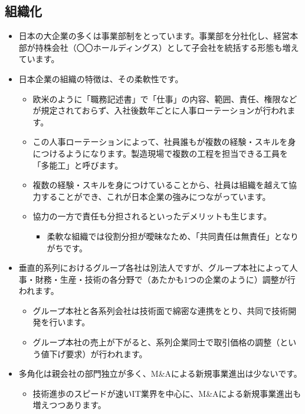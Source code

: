 \documentclass[
]{book}
\providecommand{\tightlist}{%
  \setlength{\itemsep}{0pt}\setlength{\parskip}{0pt}}
\begin{document}
\hypertarget{japan-organization}{%
\subsection{組織化}\label{japan-organization}}

\begin{itemize}
\item
  日本の大企業の多くは事業部制をとっています。事業部を分社化し、経営本部が持株会社（〇〇ホールディングス）として子会社を統括する形態も増えています。
\item
  日本企業の組織の特徴は、その柔軟性です。

  \begin{itemize}
  \item
    欧米のように「職務記述書」で「仕事」の内容、範囲、責任、権限などが規定されておらず、入社後数年ごとに人事ローテーションが行われます。
  \item
    この人事ローテーションによって、社員誰もが複数の経験・スキルを身につけるようになります。製造現場で複数の工程を担当できる工員を「多能工」と呼びます。
  \item
    複数の経験・スキルを身につけていることから、社員は組織を越えて協力することができ、これが日本企業の強みにつながっています。
  \item
    協力の一方で責任も分担されるといったデメリットも生じます。

    \begin{itemize}
    \tightlist
    \item
      柔軟な組織では役割分担が曖昧なため、「共同責任は無責任」となりがちです。
    \end{itemize}
  \end{itemize}
\item
  垂直的系列におけるグループ各社は別法人ですが、グループ本社によって人事・財務・生産・技術の各分野で（あたかも1つの企業のように）調整が行われます。

  \begin{itemize}
  \item
    グループ本社と各系列会社は技術面で綿密な連携をとり、共同で技術開発を行います。
  \item
    グループ本社の売上が下がると、系列企業同士で取引価格の調整（という値下げ要求）が行われます。
  \end{itemize}
\item
  多角化は親会社の部門独立が多く、M\&Aによる新規事業進出は少ないです。

  \begin{itemize}
  \tightlist
  \item
    技術進歩のスピードが速いIT業界を中心に、M\&Aによる新規事業進出も増えつつあります。
  \end{itemize}
\end{itemize}
\end{document}

